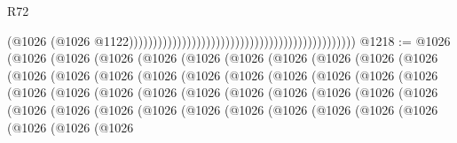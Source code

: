 \begin{lexlean}{R72}
\begin{coremodule}
                                                                                              (@1026
                                                                                                (@1026
                                                                                                  @1122)))))))))))))))))))))))))))))))))))))))))))))))
@1218 := @1026
    (@1026
      (@1026
        (@1026
          (@1026
            (@1026
              (@1026
                (@1026
                  (@1026
                    (@1026
                      (@1026
                        (@1026
                          (@1026
                            (@1026
                              (@1026
                                (@1026
                                  (@1026
                                    (@1026
                                      (@1026
                                        (@1026
                                          (@1026
                                            (@1026
                                              (@1026
                                                (@1026
                                                  (@1026
                                                    (@1026
                                                      (@1026
                                                        (@1026
                                                          (@1026
                                                            (@1026
                                                              (@1026
                                                                (@1026
                                                                  (@1026
                                                                    (@1026
                                                                      (@1026
                                                                        (@1026
                                                                          (@1026
                                                                            (@1026
                                                                              (@1026
                                                                                (@1026
                                                                                  (@1026
                                                                                    (@1026
                                                                                      (@1026
                                                                                        (@1026

\end{coremodule}
\end{lexlean}
